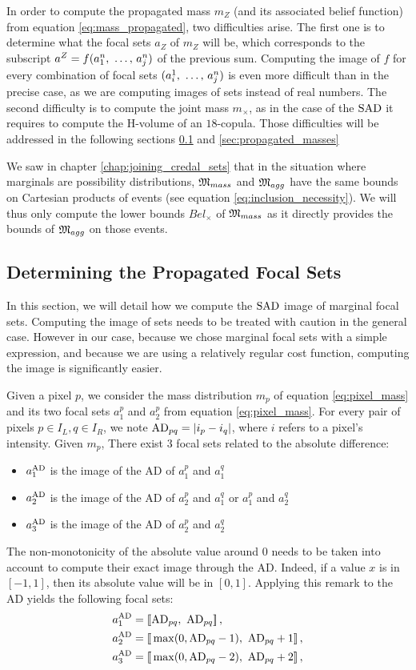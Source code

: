 In order to compute the propagated mass $m_Z$ (and its associated belief function) from equation \eqref{eq:mass_propagated}, two difficulties arise. The first one is to determine what the focal sets $a_Z$ of $m_Z$ will be, which corresponds to the subscript $a^Z=f(a^n_1 {, ~\dots, ~}  a^n_j)$ of the previous sum. Computing the image of $f$ for every combination of focal sets $(a^1_i {, ~\dots, ~} a^n_j)$ is even more difficult than in the precise case, as we are computing images of sets instead of real numbers. The second difficulty is to compute the joint mass $m_\times$, as in the case of the ${\mathrm{SAD}}$ it requires to compute the H-volume of an $18$-copula. Those difficulties will be addressed in the following sections \ref{sec:propagated_focal_sets} and \ref{sec:propagated_masses}

We saw in chapter \ref{chap:joining_credal_sets} that in the situation where marginals are possibility distributions, ${\mathfrak{M}}_{mass}$ and ${\mathfrak{M}}_{agg}$ have the same bounds on Cartesian products of events (see equation \eqref{eq:inclusion_necessity}). We will thus only compute the lower bounds $Bel_\times$ of ${\mathfrak{M}}_{mass}$ as it directly provides the bounds of ${\mathfrak{M}}_{agg}$ on those events.

\subsection{Determining the Propagated Focal Sets}\label{sec:propagated_focal_sets}
In this section, we will detail how we compute the ${\mathrm{SAD}}$ image of marginal focal sets. Computing the image of sets needs to be treated with caution in the general case. However in our case, because we chose marginal focal sets with a simple expression, and because we are using a relatively regular cost function, computing the image is significantly easier.

Given a pixel $p$, we consider the mass distribution $m_p$ of equation \eqref{eq:pixel_mass} and its two focal sets $a_1^p$ and $a_2^p$ from equation \eqref{eq:pixel_mass}. For every pair of pixels $p\in I_L, q\in I_R$, we note ${\mathrm{AD}}_{pq}=|i_p - i_q|$, where $i$ refers to a pixel's intensity. Given $m_p$, There exist $3$ focal sets related to the absolute difference:
\begin{itemize}
    \item $a^{{\mathrm{AD}}}_1$ is the image of the AD of $a^p_1$ and $a^q_1$
    \item $a^{{\mathrm{AD}}}_2$ is the image of the AD of $a^p_2$ and $a^q_1$ or $a^p_1$ and $a^q_2$
    \item  $a^{{\mathrm{AD}}}_3$ is the image of the AD of $a^p_2$ and $a^q_2$
\end{itemize}
The non-monotonicity of the absolute value around $0$ needs to be taken into account to compute their exact image through the AD. Indeed, if a value $x$ is in $[-1,1]$, then its absolute value will be in $[0,1]$. Applying this remark to the AD yields the following focal sets:
\begin{align*}
    a^{{\mathrm{AD}}}_1&={[\![}{\mathrm{AD}}_{pq},~{\mathrm{AD}}_{pq}{]\!]}\,,\\
    a^{{\mathrm{AD}}}_2&={[\![}\max(0, {\mathrm{AD}}_{pq} - 1),~{\mathrm{AD}}_{pq} + 1{]\!]}\,,\\
    a^{{\mathrm{AD}}}_3&={[\![}\max(0, {\mathrm{AD}}_{pq} - 2),~{\mathrm{AD}}_{pq} + 2{]\!]}\,,
\end{align*}

